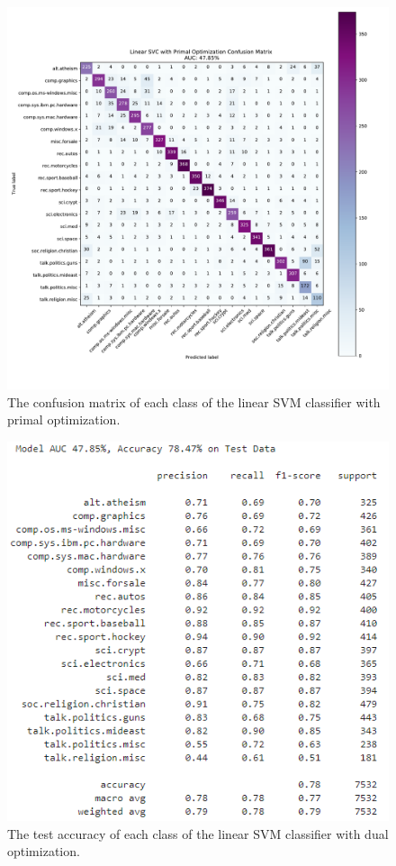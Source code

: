 \documentclass[twocolumn]{extarticle}
\begin{document}
\begin{appendices}
\begin{figure}[H]
\centering
\includegraphics[width=0.9\linewidth]{"charts/Linear SVC with Primal Optimization"}
\caption{The confusion matrix of each class of the linear SVM classifier with primal optimization.}
\label{chart:svm-primal-conf}
\end{figure}

\begin{figure}[H]
\centering
\includegraphics[width=0.9\linewidth]{charts/svm-dual-acc}
\caption{The test accuracy of each class of the linear SVM classifier with dual optimization.}
\label{chart:svm-dual-acc}
\end{figure}


\end{appendices}
\end{document}
